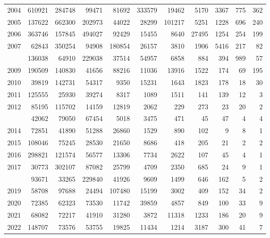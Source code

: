 \documentclass[
]{article}
\begin{document}
\begin{longtable}[t]{lrrrrrrrrrr}
2004 & 610921 & 284748 & 99471 & 81692 & 333579 & 19462 & 5170 & 3367 & 775 & 362\\
2005 & 137622 & 662300 & 202973 & 44022 & 28299 & 101217 & 5251 & 1228 & 696 & 240\\
2006 & 363746 & 157845 & 494027 & 92429 & 15455 & 8640 & 27495 & 1254 & 254 & 199\\
2007 & 62843 & 350254 & 94908 & 180854 & 26157 & 3810 & 1906 & 5416 & 217 & 82\\
\addlinespace
2008 & 136038 & 64910 & 229038 & 37514 & 54957 & 6858 & 884 & 394 & 989 & 57\\
2009 & 190509 & 140830 & 41656 & 88216 & 11036 & 13916 & 1522 & 174 & 69 & 195\\
2010 & 39819 & 142731 & 54317 & 9350 & 15231 & 1643 & 1823 & 178 & 18 & 30\\
2011 & 125555 & 25930 & 39274 & 8317 & 1089 & 1511 & 141 & 139 & 12 & 3\\
2012 & 85195 & 115702 & 14159 & 12819 & 2062 & 229 & 273 & 23 & 20 & 2\\
\addlinespace
2013 & 42062 & 79050 & 67454 & 5018 & 3475 & 471 & 45 & 47 & 4 & 4\\
2014 & 72851 & 41890 & 51288 & 26860 & 1529 & 890 & 102 & 9 & 8 & 1\\
2015 & 108046 & 75245 & 28530 & 21650 & 8686 & 418 & 205 & 21 & 2 & 2\\
2016 & 298821 & 121574 & 56577 & 13306 & 7734 & 2622 & 107 & 45 & 4 & 1\\
2017 & 30773 & 302107 & 87082 & 25799 & 4709 & 2350 & 685 & 24 & 9 & 1\\
\addlinespace
2018 & 93671 & 33265 & 229840 & 41926 & 9609 & 1499 & 646 & 162 & 5 & 2\\
2019 & 58708 & 97688 & 24494 & 107480 & 15199 & 3002 & 409 & 152 & 34 & 2\\
2020 & 72385 & 62323 & 73530 & 11742 & 39859 & 4857 & 849 & 100 & 33 & 9\\
2021 & 68082 & 72217 & 41910 & 31280 & 3872 & 11318 & 1233 & 186 & 20 & 9\\
2022 & 148707 & 73576 & 53755 & 19825 & 11434 & 1214 & 3187 & 300 & 41 & 7\\*
\end{longtable}
\end{document}

